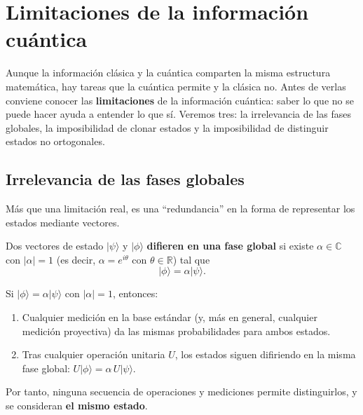 \documentclass[11pt, a4paper, twoside, openright]{report}
\begin{document}
\cleardoublepage
\section{Limitaciones de la información cuántica}

\noindent Aunque la información clásica y la cuántica comparten la misma estructura matemática, hay tareas que la cuántica permite y la clásica no. Antes de verlas conviene conocer las \textbf{limitaciones} de la información cuántica: saber lo que no se puede hacer ayuda a entender lo que sí. Veremos tres: la irrelevancia de las fases globales, la imposibilidad de clonar estados y la imposibilidad de distinguir estados no ortogonales.

\subsection{Irrelevancia de las fases globales}

\noindent Más que una limitación real, es una ``redundancia'' en la forma de representar los estados mediante vectores.

\begin{tcolorbox}[colback=teal!5!white,colframe=teal!75!black,title=\textbf{Definición: Fase global}]
Dos vectores de estado $|\psi\rangle$ y $|\phi\rangle$ \textbf{difieren en una fase global} si existe $\alpha\in\mathbb{C}$ con $|\alpha| = 1$ (es decir, $\alpha = e^{i\theta}$ con $\theta\in\mathbb{R}$) tal que
\[ |\phi\rangle = \alpha|\psi\rangle. \]
\end{tcolorbox}

\begin{tcolorbox}[colback=teal!5!white,colframe=teal!75!black,title=\textbf{Proposición: Los estados que difieren en una fase global son indistinguibles}]
Si $|\phi\rangle = \alpha|\psi\rangle$ con $|\alpha| = 1$, entonces:
\begin{enumerate}
    \item Cualquier medición en la base estándar (y, más en general, cualquier medición proyectiva) da las mismas probabilidades para ambos estados.
    \item Tras cualquier operación unitaria $U$, los estados siguen difiriendo en la misma fase global: $U|\phi\rangle = \alpha\,U|\psi\rangle$.
\end{enumerate}
Por tanto, ninguna secuencia de operaciones y mediciones permite distinguirlos, y se consideran \textbf{el mismo estado}.
\end{tcolorbox}
\end{document}
